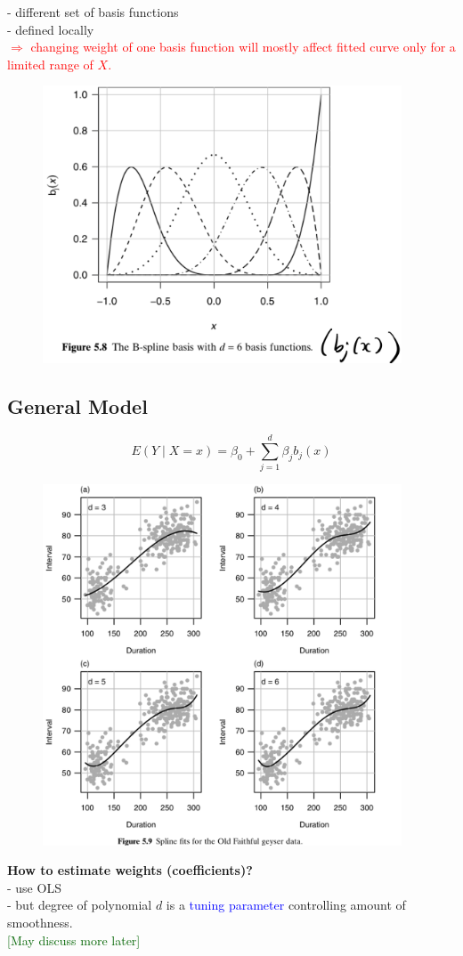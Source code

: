 \documentclass[14pt]{extarticle}
\begin{document}
\noindent
- different set of basis functions\\
- defined locally\\
\textcolor{red}{$\Rightarrow$ changing weight of one basis function will mostly affect fitted curve only for a limited range of $X$.}
\begin{figure}[H]
    \centering
    \includegraphics[width=0.95\textwidth]{fig33.png}
\end{figure}

\subsection*{General Model}

\[
E(Y \mid X = x) = \beta_0 + \sum_{j=1}^{d} \beta_j b_j(x)
\]
\begin{figure}[H]
    \centering
    \includegraphics[width=0.95\textwidth]{fig34.png}
\end{figure}
\noindent
\textbf{How to estimate weights (coefficients)?}\\
- use OLS\\
- but degree of polynomial $d$ is a \textcolor{blue}{tuning parameter} controlling amount of smoothness.\\
\textcolor{darkgreen}{[May discuss more later]}
\end{document}
